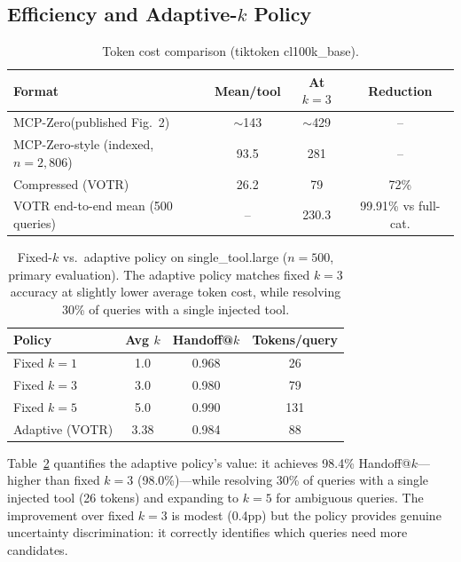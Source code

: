 \documentclass[sigconf,anonymous,review]{acmart}
\newcommand{\votr}{\textsc{VOTR}\xspace}
\newcommand{\mcpzero}{MCP-Zero\xspace}
\begin{document}
\subsection{Efficiency and Adaptive-$k$ Policy}

\begin{table}[t]
\centering
\small
\caption{Token cost comparison (tiktoken cl100k\_base).}
\label{tab:tokens}
\begin{tabular}{@{}lccc@{}}
\toprule
Format & Mean/tool & At $k=3$ & Reduction \\
\midrule
\mcpzero (published Fig.~2)           & $\sim$143 & $\sim$429 & -- \\
\mcpzero-style (indexed, $n=2{,}806$) & 93.5      & 281       & -- \\
Compressed (\votr)                    & 26.2      & 79        & 72\% \\
\votr end-to-end mean (500 queries)   & --        & 230.3     & 99.91\% vs full-cat. \\
\bottomrule
\end{tabular}
\end{table}

\begin{table}[t]
\centering
\small
\caption{Fixed-$k$ vs.\ adaptive policy on single\_tool.large ($n=500$, primary
evaluation). The adaptive policy matches fixed $k=3$ accuracy at slightly lower
average token cost, while resolving 30\% of queries with a single injected tool.}
\label{tab:fixedk}
\begin{tabular}{@{}lccc@{}}
\toprule
Policy & Avg $k$ & Handoff@$k$ & Tokens/query \\
\midrule
Fixed $k=1$       & 1.0   & 0.968 & 26 \\
Fixed $k=3$       & 3.0   & 0.980 & 79 \\
Fixed $k=5$       & 5.0   & 0.990 & 131 \\
Adaptive (\votr)  & 3.38  & 0.984 & 88 \\
\bottomrule
\end{tabular}
\end{table}

Table~\ref{tab:fixedk} quantifies the adaptive policy's value: it achieves 98.4\%
Handoff@$k$---higher than fixed $k=3$ (98.0\%)---while resolving 30\% of queries
with a single injected tool (26 tokens) and expanding to $k=5$ for ambiguous
queries.
The improvement over fixed $k=3$ is modest (0.4pp) but the policy provides genuine
uncertainty discrimination: it correctly identifies which queries need more
candidates.
\end{document}
